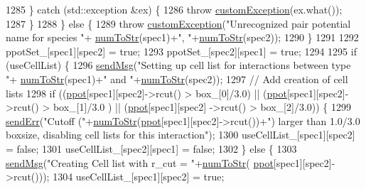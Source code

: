 \begin{DoxyCode}
1285         \} \textcolor{keywordflow}{catch} (std::exception &ex) \{
1286             \textcolor{keywordflow}{throw} \hyperlink{classcustom_exception}{customException}(ex.what());
1287         \}
1288     \} \textcolor{keywordflow}{else} \{
1289         \textcolor{keywordflow}{throw} \hyperlink{classcustom_exception}{customException}(\textcolor{stringliteral}{"Unrecognized pair potential name for species "}+
      \hyperlink{utilities_8h_ae6ed8fadf719af789711a7c0e99f44bc}{numToStr}(spec1)+\textcolor{stringliteral}{", "}+\hyperlink{utilities_8h_ae6ed8fadf719af789711a7c0e99f44bc}{numToStr}(spec2));
1290     \}
1291 
1292     ppotSet\_[spec1][spec2] = \textcolor{keyword}{true};
1293     ppotSet\_[spec2][spec1] = \textcolor{keyword}{true};
1294 
1295     \textcolor{keywordflow}{if} (useCellList) \{
1296         \hyperlink{utilities_8cpp_a08974c73a5b36c28b8ad1ef47fca77b0}{sendMsg}(\textcolor{stringliteral}{"Setting up cell list for interactions between type "}+
      \hyperlink{utilities_8h_ae6ed8fadf719af789711a7c0e99f44bc}{numToStr}(spec1)+\textcolor{stringliteral}{" and "}+\hyperlink{utilities_8h_ae6ed8fadf719af789711a7c0e99f44bc}{numToStr}(spec2));
1297         \textcolor{comment}{// Add creation of cell lists}
1298         \textcolor{keywordflow}{if} ((\hyperlink{classsim_system_ad2e290b5963f132e6a3a56cee35c8e9f}{ppot}[spec1][spec2]->rcut() > box\_[0]/3.0) || (\hyperlink{classsim_system_ad2e290b5963f132e6a3a56cee35c8e9f}{ppot}[spec1][spec2]->rcut() > box\_[1]/3.0
      ) || (\hyperlink{classsim_system_ad2e290b5963f132e6a3a56cee35c8e9f}{ppot}[spec1][spec2] ->rcut() > box\_[2]/3.0)) \{
1299             \hyperlink{utilities_8cpp_a6dacf3c3c19aa1e13a4d5a148fe5114e}{sendErr}(\textcolor{stringliteral}{"Cutoff ("}+\hyperlink{utilities_8h_ae6ed8fadf719af789711a7c0e99f44bc}{numToStr}(\hyperlink{classsim_system_ad2e290b5963f132e6a3a56cee35c8e9f}{ppot}[spec1][spec2]->rcut())+\textcolor{stringliteral}{") larger than
       1.0/3.0 boxsize, disabling cell lists for this interaction"});
1300             useCellList\_[spec1][spec2] = \textcolor{keyword}{false};
1301             useCellList\_[spec2][spec1] = \textcolor{keyword}{false};
1302         \} \textcolor{keywordflow}{else} \{
1303             \hyperlink{utilities_8cpp_a08974c73a5b36c28b8ad1ef47fca77b0}{sendMsg}(\textcolor{stringliteral}{"Creating Cell list with r\_cut = "}+\hyperlink{utilities_8h_ae6ed8fadf719af789711a7c0e99f44bc}{numToStr}(
      \hyperlink{classsim_system_ad2e290b5963f132e6a3a56cee35c8e9f}{ppot}[spec1][spec2]->rcut()));
1304             useCellList\_[spec1][spec2] = \textcolor{keyword}{true};

\end{DoxyCode}
